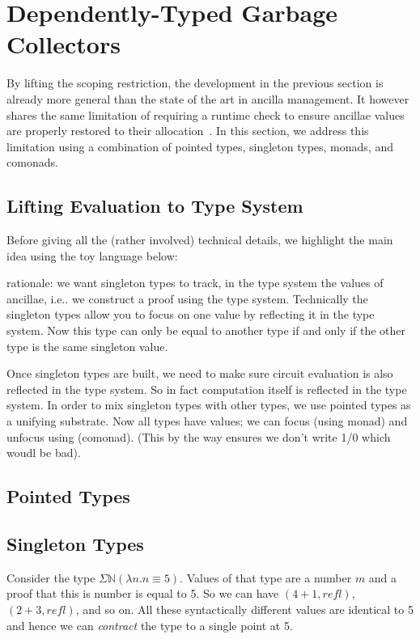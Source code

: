\documentclass[sigplan,10pt,review,anonymous]{acmart}
\begin{document}
\section{Dependently-Typed Garbage Collectors}
\label{sec:dep}

By lifting the scoping restriction, the development in the previous
section is already more general than the state of the art in ancilla
management.  It however shares the same limitation of requiring a
runtime check to ensure ancillae values are properly restored to their
allocation~\cite{10.1007/978-3-319-20860-2_13,Green:2013:QSQ:2491956.2462177}.
In this section, we address this limitation using a combination of
pointed types, singleton types, monads, and comonads.

\subsection{Lifting Evaluation to Type System}

Before giving all the (rather involved) technical details, we
highlight the main idea using the toy language below:

\Jexample{}

rationale: we want singleton types to track, in the type system
the values of ancillae, i.e.. we construct a proof using the type
system. Technically the singleton types allow you to focus on one
value by reflecting it in the type system. Now this type can only be
equal to another type if and only if the other type is the same
singleton value.

Once singleton types are built, we need to make sure circuit
evaluation is also reflected in the type system. So in fact
computation itself is reflected in the type system. In order to mix
singleton types with other types, we use pointed types as a unifying
substrate. Now all types have values; we can focus (using monad) and
unfocus using (comonad). (This by the way ensures we don't write 1/0
which woudl be bad). 

\subsection{Pointed Types}
 
\subsection{Singleton Types}
 
Consider the type $\Sigma \mathbb{N} (\lambda n. n \equiv 5)$. Values
of that type are a number $m$ and a proof that this is number is equal
to 5. So we can have $(4 + 1, \textit{refl})$, $(2 + 3 ,
\textit{refl})$, and so on. All these syntactically different values
are identical to 5 and hence we can \emph{contract} the type to a
single point at 5. 
\end{document}
